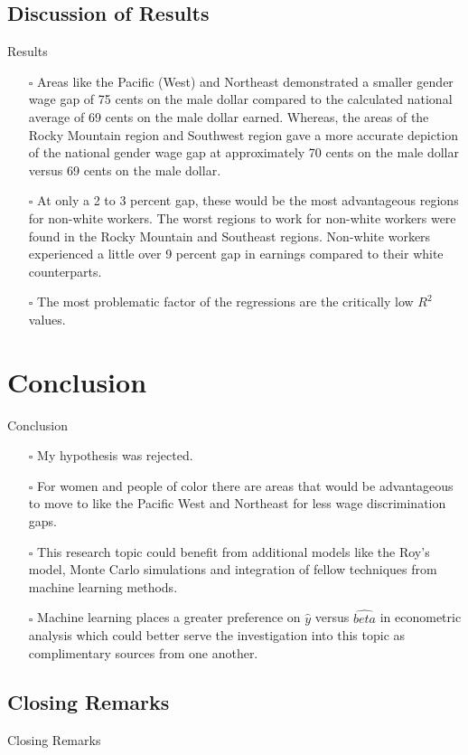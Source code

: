 \documentclass[9pt]{beamer}
\begin{document}
\subsection{Discussion of Results}
\begin{frame}{Results}
\begin{itemize}
\setlength\itemsep{1em}
    \item[$\square$] Areas like the Pacific (West) and Northeast demonstrated a smaller gender wage gap of 75 cents on the male dollar compared to the calculated national average of 69 cents on the male dollar earned. Whereas, the areas of the Rocky Mountain region and Southwest region gave a more accurate depiction of the national gender wage gap at approximately 70 cents on the male dollar versus 69 cents on the male dollar.
    \item[$\square$]   At only a 2 to 3 percent gap, these would be the most advantageous regions for non-white workers. The worst regions to work for non-white workers were found in the Rocky Mountain and Southeast regions. Non-white workers experienced a little over 9 percent gap in earnings compared to their white counterparts.
    \item[$\square$] The most problematic factor of the regressions are the critically low \begin{math} R^2 \end{math} values.
\end{itemize}
\end{frame}

\section{Conclusion}
\begin{frame}{Conclusion}
\begin{itemize}
\setlength\itemsep{1em}
    \item[$\square$] My hypothesis was rejected.
    \item[$\square$] For women and people of color there are areas that would be advantageous to move to like the Pacific West and Northeast for less wage discrimination gaps. 
    \item[$\square$] This research topic could benefit from additional models like the Roy's model, Monte Carlo simulations and integration of fellow techniques from machine learning methods.
    \item[$\square$]  Machine learning places a greater preference on \begin{math} \hat{y} \end{math} versus \begin{math} \hat{beta} \end{math} in econometric analysis which could better serve the investigation into this topic as complimentary sources from one another.
\end{itemize}
\end{frame}

\subsection{Closing Remarks}
\begin{frame}{Closing Remarks}
\huge
    \newline
    \newline
\huge
    \boldsymbol{!}
\end{frame}
\end{document}
